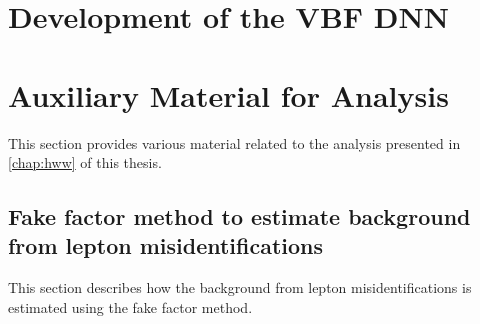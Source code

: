 \chapter{Development of the VBF DNN}
\label{app:chap:DNN}



\FloatBarrier
\chapter{Auxiliary Material for \HWW Analysis}
This section provides various material related to the \HWW analysis presented in \cref{chap:hww} of this thesis.


\FloatBarrier
\section{Fake factor method to estimate background from lepton misidentifications}
\label{app:fake-factor-method}
This section describes how the background from lepton misidentifications is estimated using the fake factor method.

